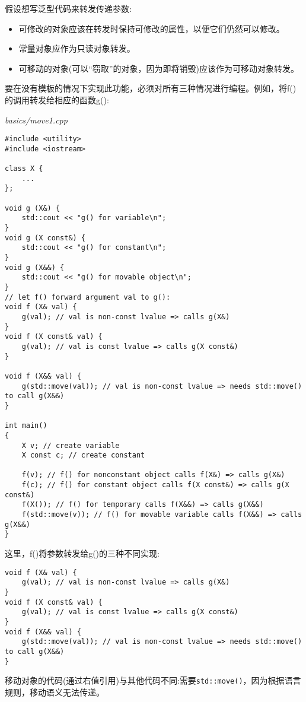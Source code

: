假设想写泛型代码来转发传递参数:

\begin{itemize}
\item 
可修改的对象应该在转发时保持可修改的属性，以便它们仍然可以修改。

\item 
常量对象应作为只读对象转发。

\item 
可移动的对象(可以“窃取”的对象，因为即将销毁)应该作为可移动对象转发。
\end{itemize}

要在没有模板的情况下实现此功能，必须对所有三种情况进行编程。例如，将f()的调用转发给相应的函数g():

\noindent
\textit{basics/move1.cpp}
\begin{lstlisting}[style=styleCXX]
#include <utility>
#include <iostream>

class X {
	...
};

void g (X&) {
	std::cout << "g() for variable\n";
}
void g (X const&) {
	std::cout << "g() for constant\n";
}
void g (X&&) {
	std::cout << "g() for movable object\n";
}
// let f() forward argument val to g():
void f (X& val) {
	g(val); // val is non-const lvalue => calls g(X&)
}
void f (X const& val) {
	g(val); // val is const lvalue => calls g(X const&)
}

void f (X&& val) {
	g(std::move(val)); // val is non-const lvalue => needs std::move() to call g(X&&)
}

int main()
{
	X v; // create variable
	X const c; // create constant
	
	f(v); // f() for nonconstant object calls f(X&) => calls g(X&)
	f(c); // f() for constant object calls f(X const&) => calls g(X const&)
	f(X()); // f() for temporary calls f(X&&) => calls g(X&&)
	f(std::move(v)); // f() for movable variable calls f(X&&) => calls g(X&&)
}
\end{lstlisting}

这里，f()将参数转发给g()的三种不同实现:

\begin{lstlisting}[style=styleCXX]
void f (X& val) {
	g(val); // val is non-const lvalue => calls g(X&)
}
void f (X const& val) {
	g(val); // val is const lvalue => calls g(X const&)
}
void f (X&& val) {
	g(std::move(val)); // val is non-const lvalue => needs std::move() to call g(X&&)
}
\end{lstlisting}

移动对象的代码(通过右值引用)与其他代码不同:需要\texttt{std::move()}，因为根据语言规则，移动语义无法传递。

